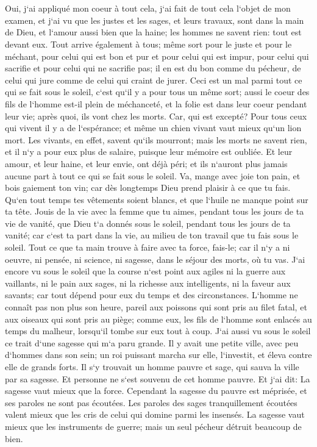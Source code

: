 \chapter{}

\verse Oui, j`ai appliqué mon coeur à tout cela, j`ai fait de tout cela l`objet de mon examen, et j`ai vu que les justes et les sages, et leurs travaux, sont dans la main de Dieu, et l`amour aussi bien que la haine; les hommes ne savent rien: tout est devant eux. 
\verse Tout arrive également à tous; même sort pour le juste et pour le méchant, pour celui qui est bon et pur et pour celui qui est impur, pour celui qui sacrifie et pour celui qui ne sacrifie pas; il en est du bon comme du pécheur, de celui qui jure comme de celui qui craint de jurer. 
\verse Ceci est un mal parmi tout ce qui se fait sous le soleil, c`est qu`il y a pour tous un même sort; aussi le coeur des fils de l`homme est-il plein de méchanceté, et la folie est dans leur coeur pendant leur vie; après quoi, ils vont chez les morts. Car, qui est excepté? 
\verse Pour tous ceux qui vivent il y a de l`espérance; et même un chien vivant vaut mieux qu`un lion mort. 
\verse Les vivants, en effet, savent qu`ils mourront; mais les morts ne savent rien, et il n`y a pour eux plus de salaire, puisque leur mémoire est oubliée. 
\verse Et leur amour, et leur haine, et leur envie, ont déjà péri; et ils n`auront plus jamais aucune part à tout ce qui se fait sous le soleil. 
\verse Va, mange avec joie ton pain, et bois gaiement ton vin; car dès longtemps Dieu prend plaisir à ce que tu fais. 
\verse Qu`en tout temps tes vêtements soient blancs, et que l`huile ne manque point sur ta tête. 
\verse Jouis de la vie avec la femme que tu aimes, pendant tous les jours de ta vie de vanité, que Dieu t`a donnés sous le soleil, pendant tous les jours de ta vanité; car c`est ta part dans la vie, au milieu de ton travail que tu fais sous le soleil. 
\verse Tout ce que ta main trouve à faire avec ta force, fais-le; car il n`y a ni oeuvre, ni pensée, ni science, ni sagesse, dans le séjour des morts, où tu vas. 
\verse J`ai encore vu sous le soleil que la course n`est point aux agiles ni la guerre aux vaillants, ni le pain aux sages, ni la richesse aux intelligents, ni la faveur aux savants; car tout dépend pour eux du temps et des circonstances. 
\verse L`homme ne connaît pas non plus son heure, pareil aux poissons qui sont pris au filet fatal, et aux oiseaux qui sont pris au piège; comme eux, les fils de l`homme sont enlacés au temps du malheur, lorsqu`il tombe sur eux tout à coup. 
\verse J`ai aussi vu sous le soleil ce trait d`une sagesse qui m`a paru grande. 
\verse Il y avait une petite ville, avec peu d`hommes dans son sein; un roi puissant marcha sur elle, l`investit, et éleva contre elle de grands forts. 
\verse Il s`y trouvait un homme pauvre et sage, qui sauva la ville par sa sagesse. Et personne ne s`est souvenu de cet homme pauvre. 
\verse Et j`ai dit: La sagesse vaut mieux que la force. Cependant la sagesse du pauvre est méprisée, et ses paroles ne sont pas écoutées. 
\verse Les paroles des sages tranquillement écoutées valent mieux que les cris de celui qui domine parmi les insensés. 
\verse La sagesse vaut mieux que les instruments de guerre; mais un seul pécheur détruit beaucoup de bien. 

